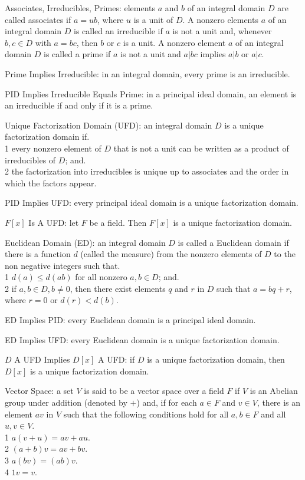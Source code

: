 Associates, Irreducibles, Primes: elements $a$ and $b$ of an integral domain $D$ are called associates if $a=ub$, where $u$ is a unit of $D$. A nonzero elements $a$ of an integral domain $D$ is called an irreducible if $a$ is not a unit and, whenever $b,c \in D$ with $a=bc$, then $b$ or $c$ is a unit. A nonzero element $a$ of an integral domain $D$ is called a prime if $a$ is not a unit and $a | bc$ implies $a | b$ or $a | c$.

Prime Implies Irreducible: in an integral domain, every prime is an irreducible.

PID Implies Irreducible Equals Prime: in a principal ideal domain, an element is an irreducible if and only if it is a prime.

Unique Factorization Domain (UFD): an integral domain $D$ is a unique factorization domain if. \\
1 every nonzero element of $D$ that is not a unit can be written as a product of irreducibles of $D$; and. \\
2 the factorization into irreducibles is unique up to associates and the order in which the factors appear.

PID Implies UFD: every principal ideal domain is a unique factorization domain.

$F[x]$ Is A UFD: let $F$ be a field. Then $F[x]$ is a unique factorization domain.

Euclidean Domain (ED): an integral domain $D$ is called a Euclidean domain if there is a function $d$ (called the measure) from the nonzero elements of $D$ to the non negative integers such that. \\
1 $d(a) \le d(ab)$ for all nonzero $a,b \in D$; and. \\
2 if $a,b \in D, b \neq 0$, then there exist elements $q$ and $r$ in $D$ such that $a=bq+r$, where $r=0$ or $d(r) < d(b)$.

ED Implies PID: every Euclidean domain is a principal ideal domain.

ED Implies UFD: every Euclidean domain is a unique factorization domain.

$D$ A UFD Implies $D[x]$ A UFD: if $D$ is a unique factorization domain, then $D[x]$ is a unique factorization domain.

Vector Space: a set $V$ is said to be a vector space over a field $F$ if $V$ is an Abelian group under addition (denoted by $+$) and, if for each $a \in F$ and $v \in V$, there is an element $av$ in $V$ such that the following conditions hold for all $a,b \in F$ and all $u,v \in V$. \\
1 $a(v+u)=av+au$. \\
2 $(a+b)v=av+bv$. \\
3 $a(bv)=(ab)v$. \\
4 $1v=v$.

